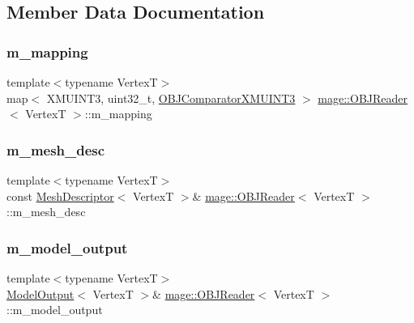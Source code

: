 \subsection{Member Data Documentation}
\hypertarget{classmage_1_1_o_b_j_reader_a3783d5387bcba3d593437f9e2c350387}{}\label{classmage_1_1_o_b_j_reader_a3783d5387bcba3d593437f9e2c350387} 
\subsubsection{\texorpdfstring{m\+\_\+mapping}{m\_mapping}}
{\footnotesize\ttfamily template$<$typename VertexT$>$ \\
map$<$ X\+M\+U\+I\+N\+T3, uint32\+\_\+t, \hyperlink{structmage_1_1_o_b_j_reader_1_1_o_b_j_comparator_x_m_u_i_n_t3}{O\+B\+J\+Comparator\+X\+M\+U\+I\+N\+T3} $>$ \hyperlink{classmage_1_1_o_b_j_reader}{mage\+::\+O\+B\+J\+Reader}$<$ VertexT $>$\+::m\+\_\+mapping\hspace{0.3cm}{\ttfamily [private]}}

\hypertarget{classmage_1_1_o_b_j_reader_a3395a44a17a5749a332751465cece640}{}\label{classmage_1_1_o_b_j_reader_a3395a44a17a5749a332751465cece640} 
\subsubsection{\texorpdfstring{m\+\_\+mesh\+\_\+desc}{m\_mesh\_desc}}
{\footnotesize\ttfamily template$<$typename VertexT$>$ \\
const \hyperlink{structmage_1_1_mesh_descriptor}{Mesh\+Descriptor}$<$ VertexT $>$\& \hyperlink{classmage_1_1_o_b_j_reader}{mage\+::\+O\+B\+J\+Reader}$<$ VertexT $>$\+::m\+\_\+mesh\+\_\+desc\hspace{0.3cm}{\ttfamily [private]}}

\hypertarget{classmage_1_1_o_b_j_reader_ad4691c59a3e3ecefd201a8f03528bbd8}{}\label{classmage_1_1_o_b_j_reader_ad4691c59a3e3ecefd201a8f03528bbd8} 
\subsubsection{\texorpdfstring{m\+\_\+model\+\_\+output}{m\_model\_output}}
{\footnotesize\ttfamily template$<$typename VertexT$>$ \\
\hyperlink{structmage_1_1_model_output}{Model\+Output}$<$ VertexT $>$\& \hyperlink{classmage_1_1_o_b_j_reader}{mage\+::\+O\+B\+J\+Reader}$<$ VertexT $>$\+::m\+\_\+model\+\_\+output\hspace{0.3cm}{\ttfamily [private]}}

